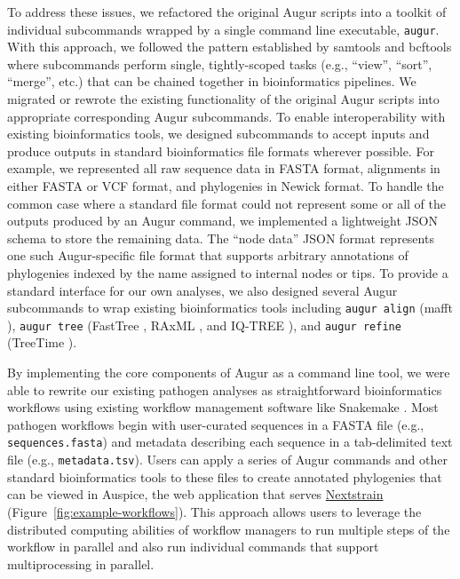 To address these issues, we refactored the original Augur scripts into a toolkit of individual subcommands wrapped by a single command line executable, \texttt{augur}.
With this approach, we followed the pattern established by samtools \citep{Li2009} and bcftools \citep{Li2011} where subcommands perform single, tightly-scoped tasks (e.g., ``view'', ``sort'', ``merge'', etc.) that can be chained together in bioinformatics pipelines.
We migrated or rewrote the existing functionality of the original Augur scripts into appropriate corresponding Augur subcommands.
To enable interoperability with existing bioinformatics tools, we designed subcommands to accept inputs and produce outputs in standard bioinformatics file formats wherever possible.
For example, we represented all raw sequence data in FASTA format, alignments in either FASTA or VCF format, and phylogenies in Newick format.
To handle the common case where a standard file format could not represent some or all of the outputs produced by an Augur command, we implemented a lightweight JSON schema to store the remaining data.
The ``node data'' JSON format represents one such Augur-specific file format that supports arbitrary annotations of phylogenies indexed by the name assigned to internal nodes or tips.
To provide a standard interface for our own analyses, we also designed several Augur subcommands to wrap existing bioinformatics tools including \texttt{augur align} (mafft \citep{Katoh2002}), \texttt{augur tree} (FastTree \citep{Price2010}, RAxML \citep{Stamatakis2014}, and IQ-TREE \citep{Nguyen2014}), and \texttt{augur refine} (TreeTime \citep{Sagulenko2018}).

By implementing the core components of Augur as a command line tool, we were able to rewrite our existing pathogen analyses as straightforward bioinformatics workflows using existing workflow management software like Snakemake \citep{Snakemake}.
Most pathogen workflows begin with user-curated sequences in a FASTA file (e.g., \texttt{sequences.fasta}) and metadata describing each sequence in a tab-delimited text file (e.g., \texttt{metadata.tsv}).
Users can apply a series of Augur commands and other standard bioinformatics tools to these files to create annotated phylogenies that can be viewed in Auspice, the web application that serves \href{https://nextstrain.org}{Nextstrain} (Figure~\ref{fig:example-workflows}).
This approach allows users to leverage the distributed computing abilities of workflow managers to run multiple steps of the workflow in parallel and also run individual commands that support multiprocessing in parallel.

